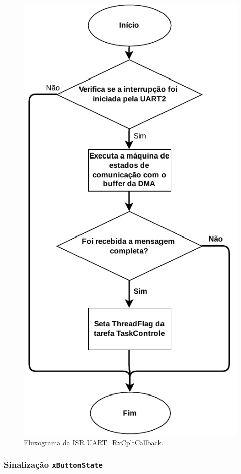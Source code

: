 \begin{figure}[H]
\centering
\includegraphics[height= 0.5\textheight]{img/fluxograma_uart2}
\caption{Fluxograma da ISR UART\_RxCpltCallback.}
\label{fig:fluxograma_uart2}
\end{figure}

\subsubsection*{Sinalização \texttt{xButtonState}}
	
